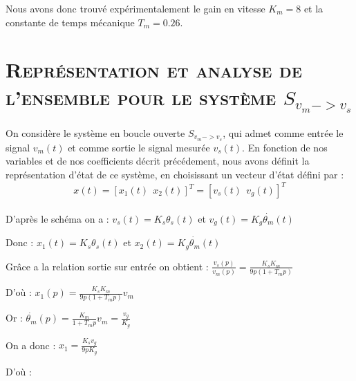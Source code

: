 \par Nous avons donc trouvé expérimentalement le gain en vitesse $K_m = 8$ et la constante de temps mécanique $T_m=0.26$.\\


\section{\textsc{Représentation et analyse de l'ensemble pour le système $S_{v_m->v_s}$}}

\paragraph{} On considère le système en boucle ouverte $S_{v_m->v_s}$, qui admet comme entrée le signal $v_m(t)$ et comme sortie le signal mesurée $v_s(t)$. En fonction de nos variables et de nos coefficients décrit précédement, nous avons définit la représentation d'état de ce système, en choisissant un vecteur d'état défini par :\\
$$x(t)=[x_1(t)~~x_2(t)]^T=[v_s(t)~~v_g(t)]^T$$

\paragraph{} D'après le schéma on a : $v_s(t)=K_s\theta_s(t)$ et $v_g(t)=K_g\dot{\theta_m}(t)$\\

\par Donc : $x_1(t)=K_s\theta_s(t)$ et $x_2(t)=K_g\dot{\theta_m}(t)$\\

\par Grâce a la relation sortie sur entrée on obtient : \Large$\frac{v_s(p)}{v_m(p)}=\frac{K_sK_m}{9p(1+T_mp)}$\\

\par \normalsize D'où : \Large$x_1(p)=\frac{K_sK_m}{9p(1+T_mp)}v_m$\\

\par \normalsize Or : \Large$\dot{\theta_m}(p)=\frac{K_m}{1+T_mp}v_m=\frac{v_g}{K_g}$\\

\par \normalsize On a donc : \Large$x_1=\frac{K_sv_g}{9pK_g}$\\

\par \normalsize D'où : \Large{}\\

